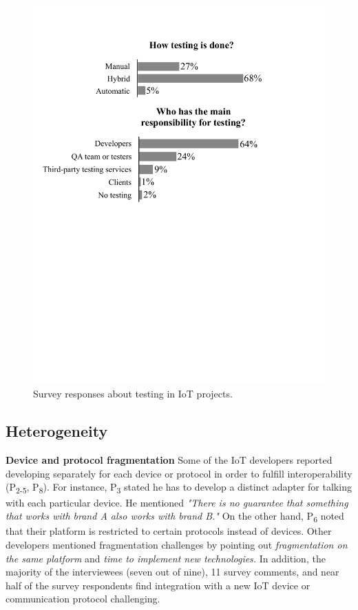  \begin{figure}%
  \centering
   \includegraphics[width=\linewidth]{imgs/testing.pdf}
  \caption{Survey responses about testing in IoT projects.
  }
  \label{fig:testing}
\end{figure}

\subsection{Heterogeneity}
\textbf{Device and protocol fragmentation} Some of the IoT developers reported developing separately for each device or protocol in order to fulfill interoperability (P\textsubscript{2-5}, P\textsubscript{8}). For instance, P\textsubscript{3} stated he has to develop a distinct adapter for talking with each particular device. He mentioned \textit{"There is no guarantee that something that works with brand A also works with brand B."} On the other hand, P\textsubscript{6} noted that their platform is restricted to certain protocols instead of devices. Other developers mentioned fragmentation challenges by pointing out \emph{fragmentation on the same platform} and \emph{time to implement new technologies.} In addition, the majority of the interviewees (seven out of nine), 11 survey comments, and near half of the survey respondents find integration with a new IoT device or communication protocol challenging. 


